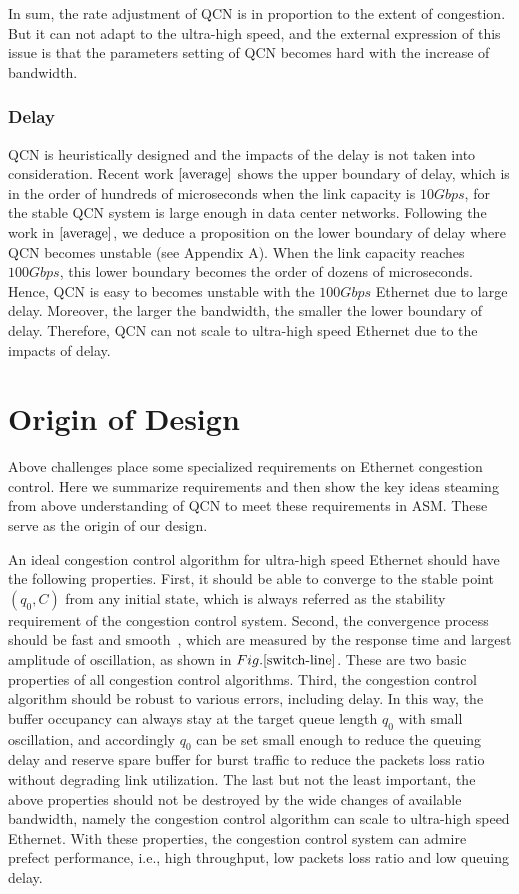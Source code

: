 \documentclass{sig-alternate-10pt}
\def\figurename{Fig.}
\begin{document}
In sum, the rate adjustment of QCN is in proportion to the extent of congestion. But it can not adapt to the ultra-high speed, and the external expression of this issue is that the parameters setting of QCN becomes hard with the increase of bandwidth.


\subsubsection{Delay}
QCN is heuristically designed and the impacts of the delay is not taken into consideration. Recent work $\cite{average}$ shows the upper boundary of delay, which is in the order of hundreds of microseconds when the link capacity is $10Gbps$, for the stable QCN system is large enough in data center networks. Following the work in $\cite{average}$, we deduce a proposition on the lower boundary of delay where QCN becomes unstable (see Appendix A). When the link capacity reaches $100Gbps$, this lower boundary becomes the order of dozens of microseconds. Hence, QCN is easy to becomes unstable with the $100Gbps$ Ethernet due to large delay. Moreover, the larger the bandwidth, the smaller the lower boundary of delay. Therefore, QCN can not scale to ultra-high speed Ethernet due to the impacts of delay.




\section{Origin of Design}
Above challenges place some specialized requirements on Ethernet congestion control. Here we summarize requirements and then show the key ideas steaming from above understanding of QCN to meet these requirements in ASM. These serve as the origin of our design.

An ideal congestion control algorithm for ultra-high speed Ethernet should have the following properties. First, it should be able to converge to the stable point $(q_0, C)$ from any initial state, which is always referred as the stability requirement of the congestion control system. Second, the convergence process should be fast and smooth~\cite{Metrics}, which are measured by the response time and largest amplitude of oscillation, as shown in $\figurename{\ref{switch-line}}$. These are two basic properties of all congestion control algorithms. Third, the congestion control algorithm should be robust to various errors, including delay. In this way, the buffer occupancy can always stay at the target queue length $q_0$ with small oscillation, and accordingly $q_0$ can be set small enough to reduce the queuing delay and reserve spare buffer for burst traffic to reduce the packets loss ratio without degrading link utilization. The last but not the least important, the above properties should not be destroyed by the wide changes of available bandwidth, namely the congestion control algorithm can scale to ultra-high speed Ethernet. With these properties, the congestion control system can admire prefect performance, i.e.,  high throughput, low packets loss ratio and low queuing delay. 
\end{document}
